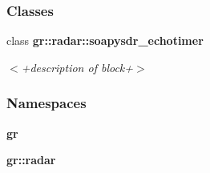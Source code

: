\subsubsection*{Classes}
\begin{DoxyCompactItemize}
\item 
class {\bf gr\+::radar\+::soapysdr\+\_\+echotimer}
\begin{DoxyCompactList}\small\item\em $<$+description of block+$>$ \end{DoxyCompactList}\end{DoxyCompactItemize}
\subsubsection*{Namespaces}
\begin{DoxyCompactItemize}
\item 
 {\bf gr}
\item 
 {\bf gr\+::radar}
\end{DoxyCompactItemize}
